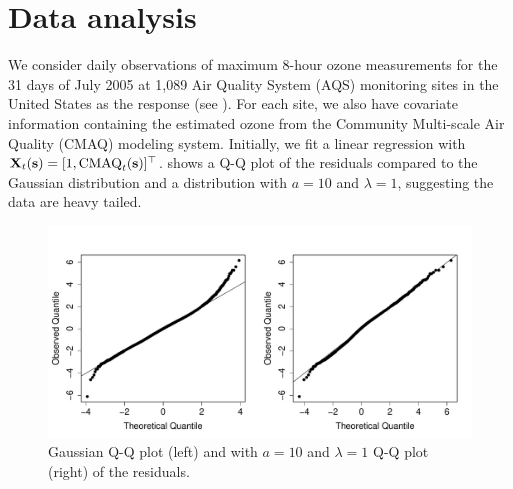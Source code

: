 \section{Data analysis}\label{sts:analysis}

We consider daily observations of maximum 8-hour ozone measurements for the 31 days of July 2005 at 1,089 Air Quality System (AQS) monitoring sites in the United States as the response (see ).
For each site, we also have covariate information containing the estimated ozone from the Community Multi-scale Air Quality (CMAQ) modeling system.
Initially, we fit a linear regression with $\mathbf{X}_t(\mathbf{s}) = [1, \text{CMAQ}_t(\mathbf{s})]^\top$. %
 shows a Q-Q plot of the residuals compared to the Gaussian distribution and a \skewt{} distribution with $a = 10$ and $\lambda = 1$, suggesting the data are heavy tailed.
\begin{figure}
  \centering
  \includegraphics[width=\linewidth]{plots/qq-res.pdf}
  \caption{Gaussian Q-Q plot (left) and \skewt{} with $a = 10$ and $\lambda = 1$ Q-Q plot (right) of the residuals.}
  \label{stfig:ozone-qq}
\end{figure}

